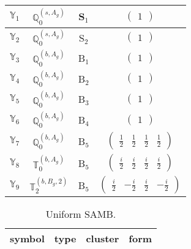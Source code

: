 \documentclass[fleqn,10pt,landscape]{article}
\begin{document}
\begin{itemize}
\begin{center}
\begin{longtable}{c|c|c|c}
$ \mathbb{Y}_{1} $ & $\mathbb{Q}_{0}^{(s,A_{g})}$ & S$_{1}$ & $\begin{pmatrix} 1 \end{pmatrix}$ \\ \hline
$ \mathbb{Y}_{2} $ & $\mathbb{Q}_{0}^{(s,A_{g})}$ & S$_{2}$ & $\begin{pmatrix} 1 \end{pmatrix}$ \\ \hline
$ \mathbb{Y}_{3} $ & $\mathbb{Q}_{0}^{(b,A_{g})}$ & B$_{1}$ & $\begin{pmatrix} 1 \end{pmatrix}$ \\ \hline
$ \mathbb{Y}_{4} $ & $\mathbb{Q}_{0}^{(b,A_{g})}$ & B$_{2}$ & $\begin{pmatrix} 1 \end{pmatrix}$ \\ \hline
$ \mathbb{Y}_{5} $ & $\mathbb{Q}_{0}^{(b,A_{g})}$ & B$_{3}$ & $\begin{pmatrix} 1 \end{pmatrix}$ \\ \hline
$ \mathbb{Y}_{6} $ & $\mathbb{Q}_{0}^{(b,A_{g})}$ & B$_{4}$ & $\begin{pmatrix} 1 \end{pmatrix}$ \\ \hline
$ \mathbb{Y}_{7} $ & $\mathbb{Q}_{0}^{(b,A_{g})}$ & B$_{5}$ & $\begin{pmatrix} \frac{1}{2} & \frac{1}{2} & \frac{1}{2} & \frac{1}{2} \end{pmatrix}$ \\
$ \mathbb{Y}_{8} $ & $\mathbb{T}_{0}^{(b,A_{g})}$ & B$_{5}$ & $\begin{pmatrix} \frac{i}{2} & \frac{i}{2} & \frac{i}{2} & \frac{i}{2} \end{pmatrix}$ \\
$ \mathbb{Y}_{9} $ & $\mathbb{T}_{2}^{(b,B_{g},2)}$ & B$_{5}$ & $\begin{pmatrix} \frac{i}{2} & - \frac{i}{2} & \frac{i}{2} & - \frac{i}{2} \end{pmatrix}$ \\
\end{longtable}
\end{center}
\begin{center}
\renewcommand{\arraystretch}{1.3}
\begin{longtable}{c|c|c|c}
\caption{Uniform SAMB.}
 \\
 \hline \hline
symbol & type & cluster & form \\ \hline \endfirsthead


\end{longtable}
\end{center}
\end{itemize}
\end{document}
